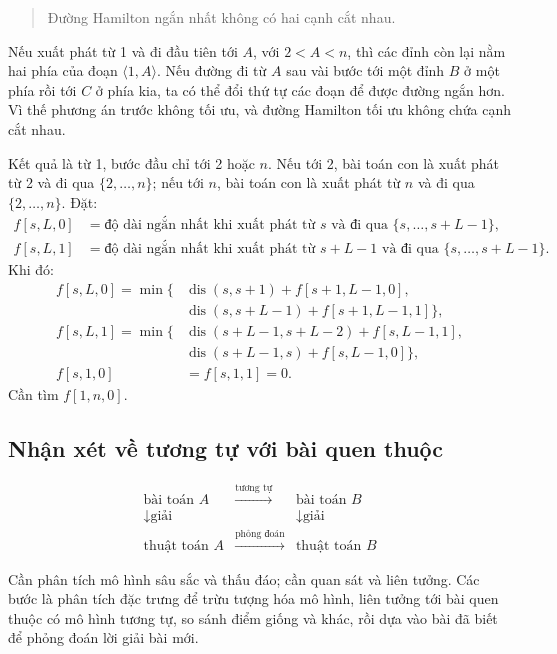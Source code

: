 \documentclass[11pt]{article}
\begin{document}
\begin{quote}
Đường Hamilton ngắn nhất không có hai cạnh cắt nhau.
\end{quote}

Nếu xuất phát từ 1 và đi đầu tiên tới \(A\), với \(2<A<n\), thì các đỉnh còn
lại nằm hai phía của đoạn \(\langle 1,A\rangle\). Nếu đường đi từ \(A\) sau
vài bước tới một đỉnh \(B\) ở một phía rồi tới \(C\) ở phía kia, ta có thể đổi
thứ tự các đoạn để được đường ngắn hơn. Vì thế phương án trước không tối ưu,
và đường Hamilton tối ưu không chứa cạnh cắt nhau.

Kết quả là từ 1, bước đầu chỉ tới 2 hoặc \(n\). Nếu tới 2, bài toán con là
xuất phát từ 2 và đi qua \(\{2,\ldots,n\}\); nếu tới \(n\), bài toán con là
xuất phát từ \(n\) và đi qua \(\{2,\ldots,n\}\). Đặt:
\[
\begin{aligned}
f[s,L,0]&=\text{độ dài ngắn nhất khi xuất phát từ }s
\text{ và đi qua }\{s,\ldots,s+L-1\},\\
f[s,L,1]&=\text{độ dài ngắn nhất khi xuất phát từ }s+L-1
\text{ và đi qua }\{s,\ldots,s+L-1\}.
\end{aligned}
\]
Khi đó:
\[
\begin{aligned}
f[s,L,0]=\min\{&
\operatorname{dis}(s,s+1)+f[s+1,L-1,0],\\
&\operatorname{dis}(s,s+L-1)+f[s+1,L-1,1]\},\\
f[s,L,1]=\min\{&
\operatorname{dis}(s+L-1,s+L-2)+f[s,L-1,1],\\
&\operatorname{dis}(s+L-1,s)+f[s,L-1,0]\},\\
f[s,1,0]&=f[s,1,1]=0.
\end{aligned}
\]
Cần tìm \(f[1,n,0]\).

\subsection{Nhận xét về tương tự với bài quen thuộc}

\[
\begin{array}{ccc}
\text{bài toán }A & \xrightarrow{\text{tương tự}} & \text{bài toán }B\\
\downarrow\scriptstyle{\text{giải}} && \downarrow\scriptstyle{\text{giải}}\\
\text{thuật toán }A & \xrightarrow{\text{phỏng đoán}} & \text{thuật toán }B
\end{array}
\]

Cần phân tích mô hình sâu sắc và thấu đáo; cần quan sát và liên tưởng. Các
bước là phân tích đặc trưng để trừu tượng hóa mô hình, liên tưởng tới bài
quen thuộc có mô hình tương tự, so sánh điểm giống và khác, rồi dựa vào bài
đã biết để phỏng đoán lời giải bài mới.
\end{document}
